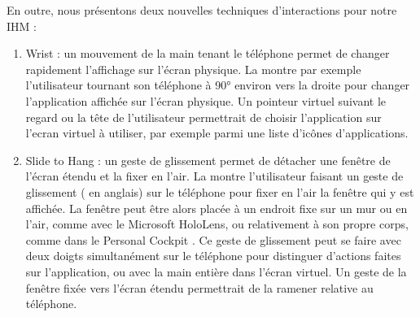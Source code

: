 En outre, nous présentons deux nouvelles techniques d'interactions pour notre IHM :
\begin{enumerate}
  \item Wrist : un mouvement de la main tenant le téléphone permet de changer rapidement l'affichage sur l'écran physique. La  montre par exemple l'utilisateur tournant son téléphone à \ang{90} environ vers la droite pour changer l'application affichée sur l'écran physique. Un pointeur virtuel suivant le regard ou la tête de l'utilisateur permettrait de choisir l'application sur l'ecran virtuel à utiliser, par exemple parmi une liste d'icônes d'applications.
  \item Slide to Hang : un geste de glissement permet de détacher une fenêtre de l'écran étendu et la fixer en l'air. La  montre l'utilisateur faisant un geste de glissement ( en anglais) sur le téléphone pour fixer en l'air la fenêtre qui y est affichée. La fenêtre peut être alors placée à un endroit fixe sur un mur ou en l'air, comme avec le Microsoft HoloLens, ou relativement à son propre corps, comme dans le Personal Cockpit \cite{Ens2014}. Ce geste de glissement peut se faire avec deux doigts simultanément sur le téléphone pour distinguer d'actions faites sur l'application, ou avec la main entière dans l'écran virtuel. Un geste de la fenêtre fixée vers l'écran étendu permettrait de la ramener relative au téléphone.
\end{enumerate}